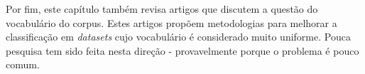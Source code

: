 Por fim, este capítulo também revisa artigos que discutem a questão do vocabulário do corpus. Estes artigos propõem metodologias para melhorar a classificação em \emph{datasets} cujo vocabulário é considerado muito uniforme. Pouca pesquisa tem sido feita nesta direção - provavelmente porque o problema é pouco comum.
 



